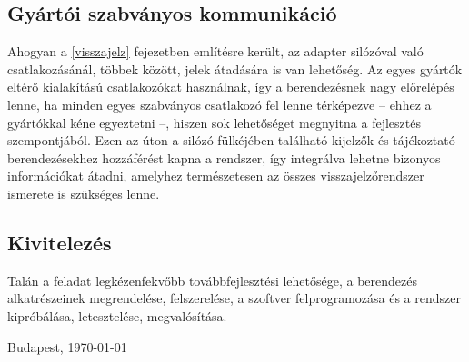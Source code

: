 \subsection{Gyártói szabványos kommunikáció}

Ahogyan a \ref{visszajelz} fejezetben említésre került, az adapter silózóval való csatlakozásánál, többek között, jelek átadására is van lehetőség. Az egyes gyártók eltérő kialakítású csatlakozókat használnak, így a berendezésnek nagy előrelépés lenne, ha minden egyes szabványos csatlakozó fel lenne térképezve -- ehhez a gyártókkal kéne egyeztetni --, hiszen sok lehetőséget megnyitna a fejlesztés szempontjából. Ezen az úton a silózó fülkéjében található kijelzők és tájékoztató berendezésekhez hozzáférést kapna a rendszer, így integrálva lehetne bizonyos információkat átadni, amelyhez természetesen az összes visszajelzőrendszer ismerete is szükséges lenne.

\subsection{Kivitelezés}

Talán a feladat legkézenfekvőbb továbbfejlesztési lehetősége, a berendezés alkatrészeinek megrendelése, felszerelése, a szoftver felprogramozása és a rendszer kipróbálása, letesztelése, megvalósítása.

\vspace{0.5cm}

\begin{flushleft}
{Budapest, \today}
\end{flushleft}

\begin{flushright}
\emph{\authorName}
\end{flushright}

\vfill
